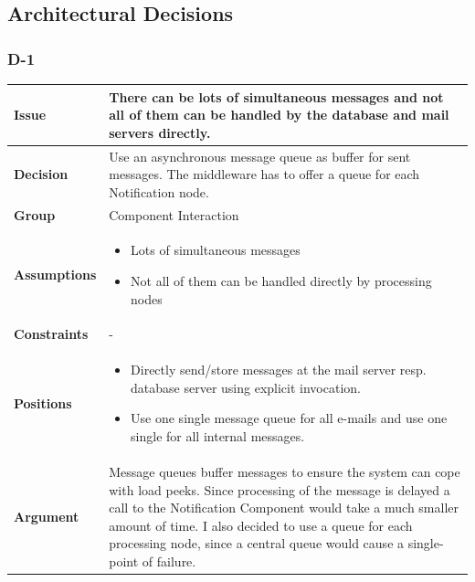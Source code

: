 \documentclass[11pt]{article}
\begin{document}
\newpage

\subsection{Architectural Decisions}

\subsubsection{D-1}

\begin{table}[h] \small
	\begin{tabularx}{\textwidth}{ | l | X |}
    	\hline
	\cellcolor[gray]{0.9}
    	\textbf{Issue} & There can be lots of simultaneous messages and not all of them can be handled by the database and mail servers directly. \\
	\hline
	\cellcolor[gray]{0.9}
	\textbf{Decision} & Use an asynchronous message queue as buffer for sent messages. The middleware has to offer a queue for each Notification node. \\
	\hline
	\cellcolor[gray]{0.9}
	\textbf{Group} & Component Interaction \\
	\hline
	\cellcolor[gray]{0.9}
	\textbf{Assumptions} &
		\begin{itemize}
		\item Lots of simultaneous messages
		\item Not all of them can be handled directly by processing nodes
		\end{itemize} \\
	\hline
	\cellcolor[gray]{0.9}
	\textbf{Constraints} & - \\
	\hline
	\cellcolor[gray]{0.9}
	\textbf{Positions} &
		\begin{itemize}
		\item Directly send/store messages at the mail server resp. database server using explicit invocation.
		\item Use one single message queue for all e-mails and use one single for all internal messages.
		\end{itemize} \\
	\hline
	\cellcolor[gray]{0.9}
	\textbf{Argument} & Message queues buffer messages to ensure the system can cope with load peeks. Since processing of the message is delayed a call to the Notification Component would take a much smaller amount of time. I also decided to use a queue for each processing node, since a central queue would cause a single-point of failure. \\

\end{tabularx}
\end{table}
\end{document}
